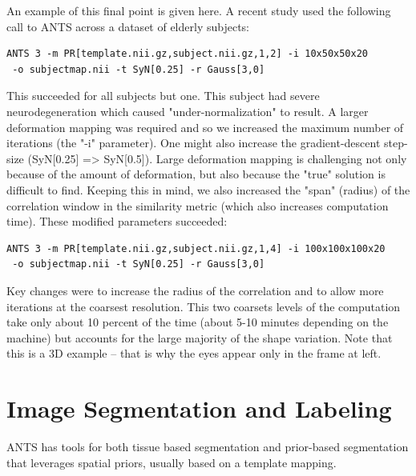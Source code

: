 \documentclass{InsightArticle}
\begin{document}
An example of this final point is given here.   
A recent study used the following call to ANTS across a dataset of elderly subjects:
\begin{verbatim}
ANTS 3 -m PR[template.nii.gz,subject.nii.gz,1,2] -i 10x50x50x20
 -o subjectmap.nii -t SyN[0.25] -r Gauss[3,0]
\end{verbatim}
This succeeded for all subjects but one.  This subject had severe neurodegeneration which caused "under-normalization" to result.  A larger deformation mapping was required and so we increased the maximum number of iterations (the "-i" parameter).  One might also increase the gradient-descent step-size (SyN[0.25] => SyN[0.5]).   Large deformation mapping is challenging not only because of the amount of deformation, but also because the "true" solution is difficult to find.  Keeping this in mind, we also increased the "span" (radius) of the correlation window in the similarity metric (which also increases computation time). These modified parameters succeeded: 
\begin{verbatim}
ANTS 3 -m PR[template.nii.gz,subject.nii.gz,1,4] -i 100x100x100x20
 -o subjectmap.nii -t SyN[0.25] -r Gauss[3,0] 
\end{verbatim}
Key changes were to increase the radius of the correlation and to
allow more iterations at the coarsest resolution.  
This two coarsets levels of the computation take only about
10 percent of the time (about 5-10 minutes depending on the machine)
but accounts for the large majority of the shape variation.  Note that
this is a 3D example -- that is why the eyes appear only in the frame
at left. 


\section{Image Segmentation and Labeling}
ANTS has tools for both tissue based segmentation and prior-based segmentation that 
leverages spatial priors, usually based on a template mapping.  
\end{document}
